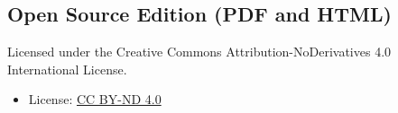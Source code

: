 \subsection*{Open Source Edition (PDF and HTML)}
Licensed under the Creative Commons Attribution-NoDerivatives 4.0 International License.

\begin{itemize}
  \item License: \href{https://creativecommons.org/licenses/by-nd/4.0/}{CC BY-ND 4.0}
\end{itemize}


\vspace*{\fill}

\newpage
\thispagestyle{empty}









\clearpage
{}





